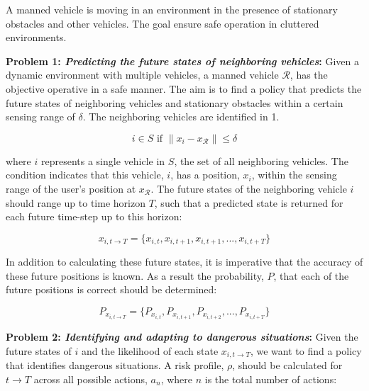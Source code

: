 \documentclass[conference]{IEEEtran}
\begin{document}
    A manned vehicle is moving in an environment in the presence of stationary obstacles and other vehicles. The goal ensure safe operation in cluttered environments.
    
    
    
    
    \textbf{Problem 1: \textit{Predicting the future states of neighboring vehicles}:}
	Given a dynamic environment with multiple vehicles, a manned vehicle $\mathcal{R}$, has the objective operative in a safe manner. The aim is to find a policy that predicts the future states of neighboring vehicles and stationary obstacles within a certain sensing range of $\delta$. The neighboring vehicles are identified in 1.
	
	\begin{equation}
	    i\in S \text{ if } \rVert x_{i}-x_{\mathcal{R}}\rVert \leq \delta 
	\end{equation}
	
	where $i$ represents a single vehicle in $S$, the set of all neighboring vehicles. The condition indicates that this vehicle, $i$, has a position, $x_{i}$, within the sensing range of the user's position at $x_{\mathcal{R}}$. The future states of the neighboring vehicle $i$ should range up to time horizon $T$, such that a predicted state is returned for each future time-step up to this horizon: 
	
	\begin{equation}
    	    x_{i,t\rightarrow T} = \{x_{i,t}, x_{i,t+1}, x_{i,t+1}, ..., x_{i,t+T}\}
	\end{equation}
	
	In addition to calculating these future states, it is imperative that the accuracy of these future positions is known. As a result the probability, $P$, that each of the future positions is correct should be determined:
	
	\begin{equation}
    	    P_{x_{i,t\rightarrow T}} = \{P_{x_{i,t}}, P_{x_{i,t+1}}, P_{x_{i,t+2}}, ..., P_{x_{i,t+T}}\}
	\end{equation}
	
	
	\textbf{Problem 2: \textit{Identifying and adapting to dangerous situations}:} Given the future states of $i$ and the likelihood of each state $x_{i,t\rightarrow T}$, we want to find a policy that identifies dangerous situations. A risk profile, $
	\rho$, should be calculated for $t\rightarrow T$ across all possible actions, $a_{n}$, where $n$ is the total number of actions:
	
\end{document}

